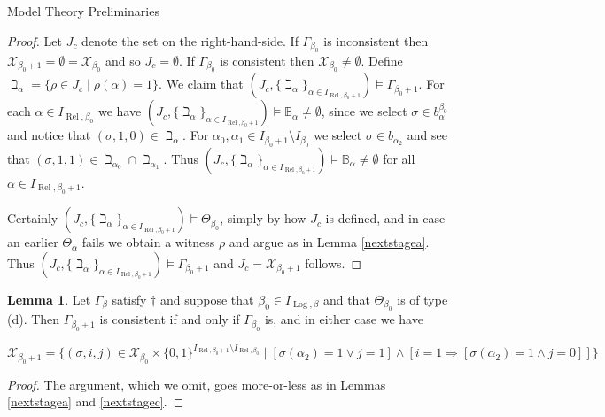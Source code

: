 \documentclass{amsart}
\theoremstyle{definition}\newtheorem{theorem}{Theorem}
\theoremstyle{definition}\newtheorem{bigtheorem}{Theorem}
\numberwithin{theorem}{section}
\theoremstyle{definition}\newtheorem{corollary}[theorem]{Corollary}
\theoremstyle{definition}\newtheorem{proposition}[theorem]{Proposition}
\theoremstyle{definition}\newtheorem{definition}[theorem]{Definition}
\theoremstyle{definition}\newtheorem{question}[theorem]{Question}
\theoremstyle{definition}\newtheorem{example}[theorem]{Example}
\theoremstyle{definition}\newtheorem{remark}[theorem]{Remark}
\theoremstyle{definition}\newtheorem{note}[theorem]{Note}
\theoremstyle{definition}\newtheorem{lemma}[theorem]{Lemma}
\theoremstyle{definition}\newtheorem{fact}[theorem]{Fact}
\theoremstyle{definition}\newtheorem{define}[theorem]{Definition}
\theoremstyle{definition}\newtheorem{definitions}[theorem]{Definitions}
\theoremstyle{definition}\newtheorem{claim}[theorem]{Claim}
\theoremstyle{definition}\newtheorem{obs}[theorem]{Observation}
\theoremstyle{definition}\newtheorem{construction}[theorem]{Construction}
\newcommand{\B}{\mathbb{B}}
\newcommand{\Rel}{\operatorname{Rel}}
\newcommand{\Log}{\operatorname{Log}}
\newcommand{\X}{\mathcal{X}}
\begin{document}
\begin{section}{Model Theory Preliminaries}
\begin{proof}  Let $J_c$ denote the set on the right-hand-side.  If $\Gamma_{\beta_0}$ is inconsistent then $\X_{\beta_0 + 1} = \emptyset = \X_{\beta_0}$ and so $J_c = \emptyset$.  If $\Gamma_{\beta_0}$ is consistent then $\X_{\beta_0} \neq \emptyset$.  Define $\beth_{\alpha} = \{\rho \in J_c \mid \rho(\alpha) = 1\}$.  We claim that $(J_c, \{\beth_{\alpha}\}_{\alpha \in I_{\Rel, \beta_0 + 1}}) \models \Gamma_{\beta_0 + 1}$.  For each $\alpha \in I_{\Rel, \beta_0}$ we have $(J_c, \{\beth_{\alpha}\}_{\alpha \in I_{\Rel, \beta_0 + 1}}) \models \B_{\alpha} \neq \emptyset$, since we select $\sigma \in b_{\alpha}^{\beta_0}$ and notice that $(\sigma, 1, 0) \in \beth_{\alpha}$.  For $\alpha_0, \alpha_1\in I_{\beta_0 + 1} \setminus I_{\beta_0}$ we select $\sigma \in b_{\alpha_2}$ and see that $(\sigma, 1, 1) \in \beth_{\alpha_0} \cap \beth_{\alpha_1}$.  Thus $(J_c, \{\beth_{\alpha}\}_{\alpha \in I_{\Rel, \beta_0 + 1}}) \models \B_{\alpha} \neq \emptyset$ for all $\alpha \in I_{\Rel, \beta_0 + 1}$.

Certainly $(J_c, \{\beth_{\alpha}\}_{\alpha \in I_{\Rel, \beta_0 + 1}}) \models \Theta_{\beta_0}$, simply by how $J_c$ is defined, and in case an earlier $\Theta_{\alpha}$ fails we obtain a witness $\rho$ and argue as in Lemma \ref{nextstagea}.  Thus $(J_c, \{\beth_{\alpha}\}_{\alpha \in I_{\Rel, \beta_0 + 1}}) \models \Gamma_{\beta_0 + 1}$ and $J_c = \X_{\beta_0 + 1}$ follows.
\end{proof}

\begin{lemma}\label{nextstaged}  Let $\Gamma_{\beta}$ satisfy $\dagger$ and suppose that $\beta_0 \in I_{\Log, \beta}$ and that $\Theta_{\beta_0}$ is of type (d).  Then $\Gamma_{\beta_0 + 1}$ is consistent if and only if $\Gamma_{\beta_0}$ is, and in either case we have 

\begin{center}
$\X_{\beta_0 + 1} = \{(\sigma, i, j)\in \X_{\beta_0} \times \{0, 1\}^{I_{\Rel, \beta_0 + 1} \setminus I_{\Rel, \beta_0}}\mid [\sigma(\alpha_2) = 1 \vee j = 1] \wedge [i = 1 \Rightarrow [\sigma(\alpha_2) = 1 \wedge j = 0]]\}$
\end{center}

\end{lemma}

\begin{proof}  The argument, which we omit, goes more-or-less as in Lemmas \ref{nextstagea} and \ref{nextstagec}.
\end{proof}



\end{section}
\end{document}
